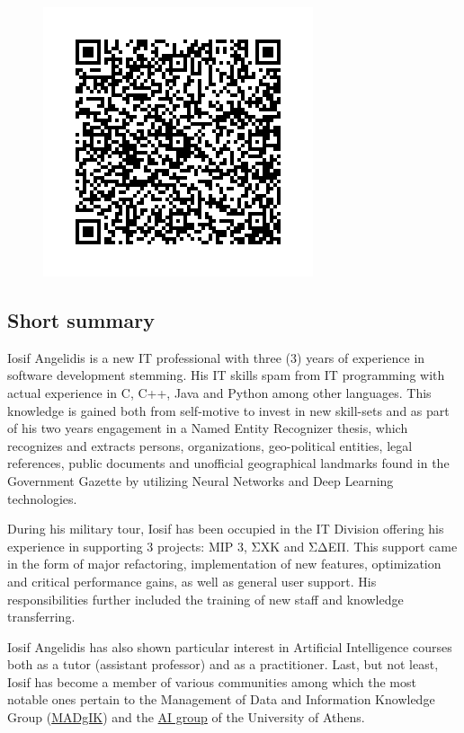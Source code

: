 \documentclass[a4paper,oneside,10pt]{article}
\begin{document}
\begin{figure}[hbt!]
	\centering
	\includegraphics[scale=0.315]{qrcode.png}%
\end{figure}

\subsection*{Short summary}

\begin{sloppypar}
	Iosif Angelidis is a new IT professional with three (3) years of experience in software development stemming. 
	His IT skills spam from IT programming with actual experience in C, C++, Java and Python among other languages. 
	This knowledge is gained both from self-motive to invest in new skill-sets and as part of his two years engagement in a Named Entity Recognizer thesis, 
	which recognizes and extracts persons, organizations, geo-political entities, legal references, public documents and 
	unofficial geographical landmarks found in the Government Gazette by utilizing Neural Networks and Deep Learning technologies.
	
	During his military tour, Iosif has been occupied in the IT Division offering his experience in supporting 3 projects: MIP 3, ΣΧΚ and ΣΔΕΠ. This support came in the form of major refactoring, implementation of new features, optimization and critical performance gains, as well as general user support. His responsibilities further included the training of new staff and knowledge transferring.
	
	Iosif Angelidis has also shown particular interest in Artificial Intelligence courses both as a tutor (assistant professor) and as a practitioner. 
	Last, but not least, Iosif has become a member of various communities among which the most notable ones pertain to the Management of Data and Information Knowledge Group (\href{http://www.madgik.di.uoa.gr}{MADgIK}) and the \href{http://ai.di.uoa.gr/}{AI group} of the University of Athens. 
\end{sloppypar}
\end{document}
